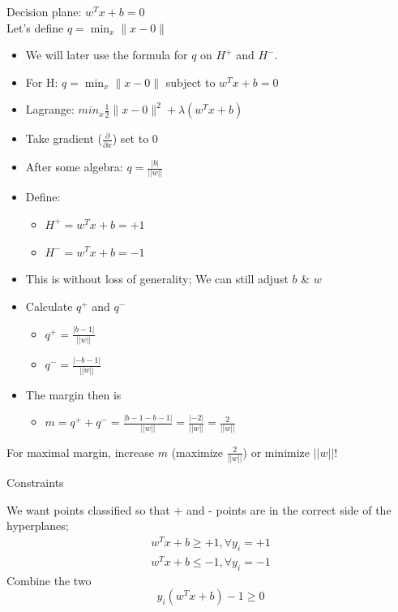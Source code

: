 \documentclass[12pt,fleqn]{article}\usepackage{../common}
\begin{document}
Decision plane: $w^{T}x + b=0$ \\
Let's define $q = \min_{x}\big\|x - 0\big\|$

\begin{itemize}
   \item We will later use the formula for $q$ on $H^{+}$ and $H^{-}$.
   \item For H: $q = \min_{x}\big\|x - 0\big\|$ subject to $w^{T}x+b=0$
   \item Lagrange: $min_{x}\frac{1}{2}\big\|x - 0\big\|^2+\lambda(w^{T}x+b)$
   \item Take gradient ($\frac{\partial}{\partial x}$) set to 0
   \item After some algebra: $q = \frac{|b|}{||w||}$
\end{itemize}


\begin{itemize}
  \item Define:
  \begin{itemize}  
  \item $H^{+} = w^{T}x + b=+1$
  \item $H^{-} = w^{T}x + b=-1$
  \end{itemize}
  \item This is without loss of generality; We can still adjust $b$ \& $w$
\end{itemize}

\begin{itemize}
  \item Calculate $q^{+}$ and $q^{-}$
  \begin{itemize}
  \item $q^{+} = \frac{|b-1|}{||w||}$
  \item $q^{-} = \frac{|-b-1|}{||w||}$
  \end{itemize}
  \item The margin then is 
  \begin{itemize}
  \item $m=q^{+}+q^{-} = \frac{|b-1-b-1|}{||w||} = \frac{|-2|}{||w||} = \frac{2}{||w||}$
  \end{itemize}  
\end{itemize}

For maximal margin, increase $m$ (maximize $\frac{2}{||w||}$) or minimize
$||w||$!

Constraints

We want points classified so that + and - points are in the correct side of the
hyperplanes;
\begin{eqnarray*}
w^{T}x+b \geq +1, \forall y_{i}=+1  \nonumber \\
w^{T}x+b \leq -1, \forall y_{i}=-1 \nonumber
\end{eqnarray*}
Combine the two
\begin{equation}
y_{i}(w^{T}x+b)-1 \geq 0 \nonumber
\end{equation}
\end{document}
